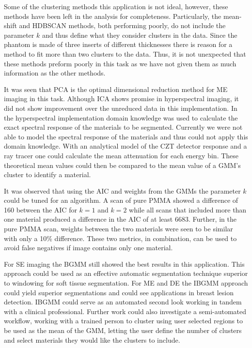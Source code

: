 \documentclass[a4paper,11pt]{article}
\begin{document}
Some of the clustering methods this application is not ideal, however, these methods have been left in the analysis for completeness. Particularly, the mean-shift and HDBSCAN methods, both performing poorly, do not include the parameter $k$ and thus define what they consider clusters in the data. Since the phantom is made of three inserts of different thicknesses there is reason for a method to fit more than two clusters to the data. Thus, it is not unexpected that these methods preform poorly in this task as we have not given them as much information as the other methods. 


It was seen that PCA is the optimal dimensional reduction method for ME imaging in this task. Although ICA shows promise in hyperspectral imaging, it did not show improvement over the unreduced data in this implementation. In the hyperspectral implementation domain knowledge was used to calculate the exact spectral response of the materials to be segmented. Currently we were not able to model the spectral response of the materials and thus could not apply this domain knowledge. With an analytical model of the CZT detector response and a ray tracer one could calculate the mean attenuation for each energy bin. These theoretical mean values could then be compared to the mean value of a GMM's cluster to identify a material.

It was observed that using the AIC and weights from the GMMs the parameter $k$ could be tuned for an algorithm. A scan of pure PMMA showed a difference of 160 between the AIC for $k=1$ and $k=2$ while all scans that included more than one material produced a difference in the AIC of at least 6683. Further, in the pure PMMA scan, weights between the two materials were seen to be similar with only a 10\% difference. These two metrics, in combination, can be used to avoid false negatives if image contains only one material.

For SE imaging the BGMM still showed the best results in this application. This approach could be used as an effective automatic segmentation technique superior to windowing for soft tissue segmentation. For ME and DE the IBGMM approach could yield superior segmentations and could see applications in breast lesion detection. IBGMM could serve as an automated second look working in tandem with a clinical professional. Further work could also investigate a semi-automated workflow, working with a trained person to cluster using user selected regions to be used as the mean of the GMM, letting the user define the number of clusters and select materials they would like the clusters to include.
\end{document}

